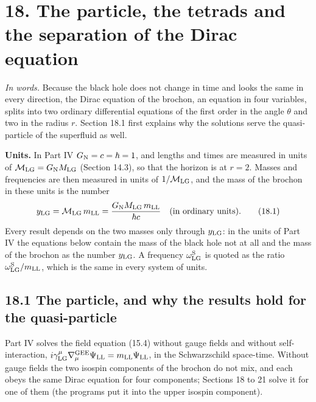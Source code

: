 \documentclass[
  10pt,
]{article}
\begin{document}
\hypertarget{the-particle-the-tetrads-and-the-separation-of-the-dirac-equation}{%
\section{18. The particle, the tetrads and the separation of the Dirac
equation}\label{the-particle-the-tetrads-and-the-separation-of-the-dirac-equation}}

\emph{In words.} Because the black hole does not change in time and
looks the same in every direction, the Dirac equation of the brochon, an
equation in four variables, splits into two ordinary differential
equations of the first order in the angle \(\theta\) and two in the
radius \(r\). Section 18.1 first explains why the solutions serve the
quasi-particle of the superfluid as well.

\textbf{Units.} In Part IV \(G_{\rm N}=c=\hbar=1\), and lengths and
times are measured in units of
\(\mathcal M_{\rm LG}=G_{\rm N}M_{\rm LG}\) (Section 14.3), so that the
horizon is at \(r=2\). Masses and frequencies are then measured in units
of \(1/\mathcal M_{\rm LG}\), and the mass of the brochon in these units
is the number
\[y_{\rm LG}=\mathcal M_{\rm LG}\,m_{\rm LL}=\frac{G_{\rm N}M_{\rm LG}\,m_{\rm LL}}{\hbar c}\quad\text{(in ordinary units)}.\tag{18.1}\]
Every result depends on the two masses only through \(y_{\rm LG}\): in
the units of Part IV the equations below contain the mass of the black
hole not at all and the mass of the brochon as the number
\(y_{\rm LG}\). A frequency \(\omega^{\rm S}_{\rm LG}\) is quoted as the
ratio \(\omega^{\rm S}_{\rm LG}/m_{\rm LL}\), which is the same in every
system of units.

\hypertarget{the-particle-and-why-the-results-hold-for-the-quasi-particle}{%
\subsection{18.1 The particle, and why the results hold for the
quasi-particle}\label{the-particle-and-why-the-results-hold-for-the-quasi-particle}}

Part IV solves the field equation (15.4) without gauge fields and
without self-interaction,
\(i\gamma^\mu_{\rm LG}\nabla^{\rm GEE}_\mu\Psi_{\rm LL}=m_{\rm LL}\Psi_{\rm LL}\),
in the Schwarzschild space-time. Without gauge fields the two isospin
components of the brochon do not mix, and each obeys the same Dirac
equation for four components; Sections 18 to 21 solve it for one of them
(the programs put it into the upper isospin component).
\end{document}
